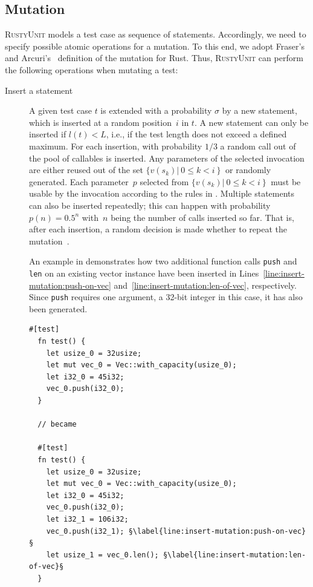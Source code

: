 \documentclass[paper=a4,%
  twoside,%
  BCOR4mm,%
  abstract=true,%
  toc=bibliography,%
  chapterprefix=true,%
  toc=bibliographynumbered,%
  open=right,%
  english,%
  pagesize=pdftex]{scrreprt}
\newcommand{\tech}{\textsc{RustyUnit}\xspace}
\begin{document}
\subsection{Mutation}
\tech models a test case as sequence of statements. Accordingly, we need to specify possible atomic operations for a mutation. To this end, we adopt Fraser's and Arcuri's~\cite{Fraser2012} definition of the mutation for Rust. Thus, \tech can perform the following operations when mutating a test:
\begin{description}
  \item[Insert a statement] A given test case $t$ is extended with a probability $\sigma$ by a new statement, which is inserted at a random position~$i$ in $t$. A new statement can only be inserted if $l(t) < L$, i.e., if the test length does not exceed a defined maximum. For each insertion, with probability $1/3$ a random call out of the pool of callables is inserted. Any parameters of the selected invocation are either reused out of the set $\{v(s_k) \left|~0 \leq k < i \right\}$ or randomly generated. Each parameter~$p$ selected from $\{v(s_k) \left|~0 \leq k < i \right\}$ must be usable by the invocation according to the rules in . Multiple statements can also be inserted repeatedly; this can happen with probability~$p(n) = 0.5^n$ with~$n$ being the number of calls inserted so far. That is, after each insertion, a random decision is made whether to repeat the mutation~\cite{Tonella2004}.

  An example in  demonstrates how two additional function calls \texttt{push} and \texttt{len} on an existing vector instance have been inserted in Lines~\ref{line:insert-mutation:push-on-vec} and~\ref{line:insert-mutation:len-of-vec}, respectively. Since \texttt{push} requires one argument, a 32-bit integer in this case, it has also been generated.

  \begin{lstlisting}[style=boxed, label=lst:mutation-invocation-insertion, caption={The functions \texttt{push} and \texttt{len} have been selected randomly to be invoked on \emph{vec\string_0}. An appropriate argument has been generated for the second \emph{push}, too}, escapechar=§]
  #[test]
  fn test() {
    let usize_0 = 32usize;
    let mut vec_0 = Vec::with_capacity(usize_0);
    let i32_0 = 45i32;
    vec_0.push(i32_0);
  }

  // became

  #[test]
  fn test() {
    let usize_0 = 32usize;
    let mut vec_0 = Vec::with_capacity(usize_0);
    let i32_0 = 45i32;
    vec_0.push(i32_0);
    let i32_1 = 106i32;
    vec_0.push(i32_1); §\label{line:insert-mutation:push-on-vec}§
    let usize_1 = vec_0.len(); §\label{line:insert-mutation:len-of-vec}§
  }
  \end{lstlisting}


\end{description}
\end{document}
